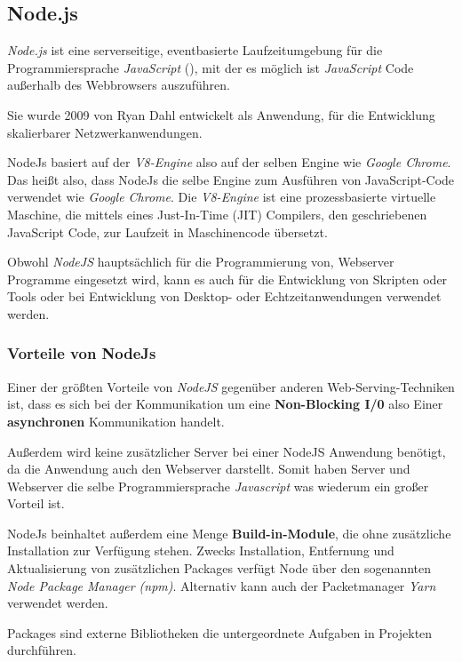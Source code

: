 \subsection{Node.js}
\label{nodejs}

\textit{Node.js} ist eine serverseitige, eventbasierte Laufzeitumgebung für die
Programmiersprache \textit{JavaScript} (),
mit der es möglich ist \textit{JavaScript} Code
außerhalb des Webbrowsers auszuführen.

Sie wurde 2009 von Ryan Dahl entwickelt als Anwendung, für die Entwicklung skalierbarer
Netzwerkanwendungen.

NodeJs basiert auf der \textit{V8-Engine} also auf der selben Engine wie \textit{Google Chrome}.
Das heißt also, dass NodeJs die selbe Engine zum Ausführen von JavaScript-Code verwendet
wie \textit{Google Chrome}.
Die \textit{V8-Engine} ist eine prozessbasierte virtuelle Maschine, die
mittels eines Just-In-Time (JIT) Compilers, den geschriebenen JavaScript Code,
zur Laufzeit in Maschinencode übersetzt.

Obwohl \textit{NodeJS} hauptsächlich für die Programmierung von, Webserver
Programme eingesetzt wird, kann es auch für die Entwicklung von
Skripten oder Tools oder bei Entwicklung von Desktop- oder Echtzeitanwendungen
verwendet werden.

\subsubsection{Vorteile von NodeJs}
Einer der größten Vorteile von \textit{NodeJS} gegenüber anderen Web-Serving-Techniken ist,
dass es sich bei der Kommunikation um eine \textbf{Non-Blocking I/0} also Einer
\textbf{asynchronen } Kommunikation handelt.

Außerdem wird keine zusätzlicher Server bei einer NodeJS Anwendung benötigt,
da die Anwendung auch den Webserver darstellt. Somit haben Server und Webserver
die selbe Programmiersprache \textit{Javascript} was wiederum ein großer Vorteil ist.

NodeJs beinhaltet außerdem eine Menge \textbf{Build-in-Module},
die ohne zusätzliche Installation zur Verfügung stehen.
Zwecks Installation, Entfernung und Aktualisierung von zusätzlichen Packages verfügt Node über den
sogenannten \textit{Node Package Manager (npm)}. Alternativ kann auch der Packetmanager
\textit{Yarn} verwendet werden.

Packages sind externe Bibliotheken die untergeordnete Aufgaben in Projekten durchführen.


